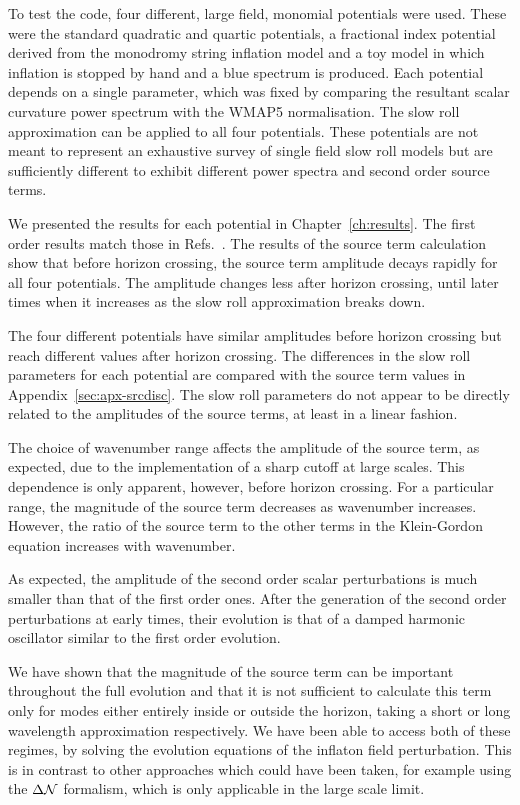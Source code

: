 To test the code, four different, large field, monomial potentials were used. These were the
standard quadratic and quartic potentials, a fractional index potential derived from the monodromy
string inflation model and a toy model in which inflation is stopped by hand and a blue spectrum is
produced.
Each potential depends on a single parameter, which was fixed by comparing the resultant scalar
curvature power spectrum with the WMAP5 normalisation. The slow roll
approximation can be applied to all four potentials. These potentials are not meant to represent an
exhaustive survey of single field slow roll models but are sufficiently different to exhibit
different power spectra and second order source terms.

We presented the results for each potential in Chapter~\ref{ch:results}. The first
order results match those in Refs.~\cite{Martin:2006rs, Ringeval:2007am, Salopek:1988qh}. The
results of the source term calculation show that before
horizon crossing, the source term amplitude decays rapidly for all four potentials.
The amplitude changes less after horizon crossing, until later times when it increases
as the slow roll approximation breaks down.

The four different potentials have similar amplitudes before horizon crossing but reach different
values after horizon crossing. The differences in the slow roll parameters for each potential are
compared with the source term values in Appendix~\ref{sec:apx-srcdisc}. The slow roll parameters
do not appear to be directly related to the amplitudes of the source terms, at least in a linear
fashion.

The choice of wavenumber range affects the amplitude of the source term, as
expected, due to the implementation of a sharp cutoff at large scales. This
dependence is only apparent, however, before horizon crossing. For a particular
range,  the magnitude of the source term decreases as wavenumber increases. However,
the ratio of the source term to the other terms in the Klein-Gordon equation increases with
wavenumber. 

As expected, the amplitude of the second order scalar perturbations is much smaller
than that of the first order ones. After the generation of the second order
perturbations at early times, their evolution is that of a damped harmonic
oscillator similar to the first order evolution.

We have shown that the magnitude of the source term can be important throughout the
full evolution and that it is not sufficient to calculate this term only for
modes either entirely inside or outside the horizon, \iec taking a short or long
wavelength approximation respectively. We have been able to access both of these
regimes, by solving the evolution equations of the
inflaton field perturbation. This is in contrast to other approaches which could
have been taken, for example using the $\Delta\mathcal{N}$
formalism, which is only applicable in the large scale limit.


